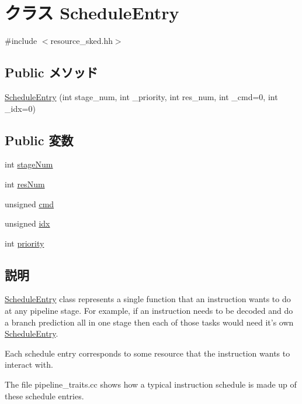 \hypertarget{classScheduleEntry}{
\section{クラス ScheduleEntry}
\label{classScheduleEntry}
}


{\ttfamily \#include $<$resource\_\-sked.hh$>$}\subsection*{Public メソッド}
\begin{DoxyCompactItemize}
\item 
\hyperlink{classScheduleEntry_a39f5765d7267f4eed1690e3c3476d2ef}{ScheduleEntry} (int stage\_\-num, int \_\-priority, int res\_\-num, int \_\-cmd=0, int \_\-idx=0)
\end{DoxyCompactItemize}
\subsection*{Public 変数}
\begin{DoxyCompactItemize}
\item 
int \hyperlink{classScheduleEntry_a9da7aa2f94c428eaed5adad96a6ab151}{stageNum}
\item 
int \hyperlink{classScheduleEntry_a4c6490c35efbfff10461ec4e6d0b0717}{resNum}
\item 
unsigned \hyperlink{classScheduleEntry_ab3d2004723874364229cf4339bb129fb}{cmd}
\item 
unsigned \hyperlink{classScheduleEntry_aef726673a09d801a40682410390442cf}{idx}
\item 
int \hyperlink{classScheduleEntry_acec9ce2df15222151ad66fcb1d74eb9f}{priority}
\end{DoxyCompactItemize}


\subsection{説明}
\hyperlink{classScheduleEntry}{ScheduleEntry} class represents a single function that an instruction wants to do at any pipeline stage. For example, if an instruction needs to be decoded and do a branch prediction all in one stage then each of those tasks would need it's own \hyperlink{classScheduleEntry}{ScheduleEntry}.

Each schedule entry corresponds to some resource that the instruction wants to interact with.

The file pipeline\_\-traits.cc shows how a typical instruction schedule is made up of these schedule entries. 

